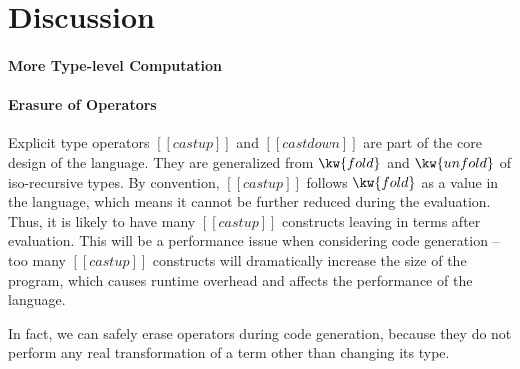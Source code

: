 \section{Discussion}
\paragraph{More Type-level Computation}


\paragraph{Erasure of \cast Operators}

Explicit type \cast operators $[[castup]]$ and $[[castdown]]$ are part of the core design of the language. They are generalized from $\kw{fold}$ and $\kw{unfold}$ of iso-recursive types. By convention, $[[castup]]$ follows $\kw{fold}$ as a value in the language, which means it cannot be further reduced during the evaluation. Thus, it is likely to have many $[[castup]]$ constructs leaving in terms after evaluation. This will be a performance issue when considering code generation -- too many $[[castup]]$ constructs will dramatically increase the size of the program, which causes runtime overhead and affects the performance of the language.

In fact, we can safely erase \cast operators during code generation, because they do not perform any real transformation of a term other than changing its type. 
